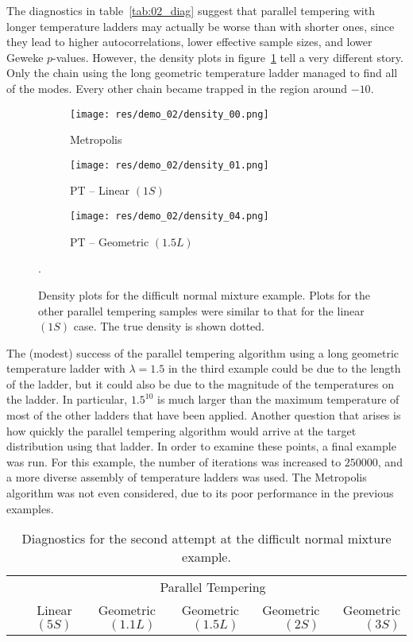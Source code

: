 The diagnostics in table~\ref{tab:02_diag} suggest that parallel tempering with
longer temperature ladders may actually be worse than with shorter ones, since
they lead to higher autocorrelations, lower effective sample sizes, and lower 
Geweke $p$-values.
However, the density plots in figure~\ref{fig:02_density} tell a very different
story. 
Only the chain using the long geometric temperature ladder managed to find
all of the modes.
Every other chain became trapped in the region around $-10$.

    \begin{figure}[h]
    \begin{subfigure}[b]{0.3\textwidth}
        \texttt{[image: res/demo\_02/density\_00.png]}
        \caption{Metropolis}
    \end{subfigure}
    \begin{subfigure}[b]{0.3\textwidth}
        \texttt{[image: res/demo\_02/density\_01.png]}
        \caption{PT -- Linear $(1S)$}
    \end{subfigure}
    \begin{subfigure}[b]{0.3\textwidth}
        \texttt{[image: res/demo\_02/density\_04.png]}
        \caption{PT -- Geometric $(1.5L)$}
    \end{subfigure}
    \caption{
    Density plots for the difficult normal mixture example.
    Plots for the other parallel tempering samples were similar to that
    for the linear $(1S)$ case.
    The true density is shown dotted.
    }
    \label{fig:02_density}.
    \end{figure}

The (modest) success of the parallel tempering algorithm using a long geometric
temperature ladder with $\lambda = 1.5$ in the third example could be due to
the length of the ladder, but it could also be due to the magnitude of the
temperatures on the ladder.
In particular, $1.5^{10}$ is much larger than the maximum temperature of most of
the other ladders that have been applied.
Another question that arises is how quickly the parallel tempering algorithm
would arrive at the target distribution using that ladder.
In order to examine these points, a final example was run.
For this example, the number of iterations was increased to $250000$, and
a more diverse assembly of temperature ladders was used.
The Metropolis algorithm was not even considered, due to its poor performance
in the previous examples.

    \begin{table}[h]
    \begin{tabular}{lrrrrr}
    \toprule
    & \multicolumn{5}{c}{Parallel Tempering} \\
    \cmidrule(l){2-6}
    & Linear $(5S)$ & Geometric $(1.1L)$ & Geometric $(1.5L)$ 
    & Geometric $(2S)$ & Geometric $(3S)$ \\
    \midrule
    
    \bottomrule
    \end{tabular}
    \caption{
    Diagnostics for the second attempt at the difficult normal mixture example.
    }
    \label{tab:03_diag}
    \end{table}

